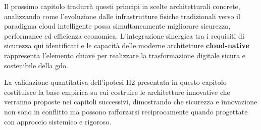 Il prossimo capitolo tradurrà questi principi in scelte architetturali concrete, analizzando come l'evoluzione dalle infrastrutture fisiche tradizionali verso il paradigma cloud intelligente possa simultaneamente migliorare sicurezza, performance ed efficienza economica. L'integrazione sinergica tra i requisiti di sicurezza qui identificati e le capacità delle moderne architetture \textbf{\gls{cloud-native}} rappresenta l'elemento chiave per realizzare la trasformazione digitale sicura e sostenibile della \gls{gdo}.

La validazione quantitativa dell'ipotesi H2 presentata in questo capitolo costituisce la base empirica su cui costruire le architetture innovative che verranno proposte nei capitoli successivi, dimostrando che sicurezza e innovazione non sono in conflitto ma possono rafforzarsi reciprocamente quando progettate con approccio sistemico e rigoroso.





